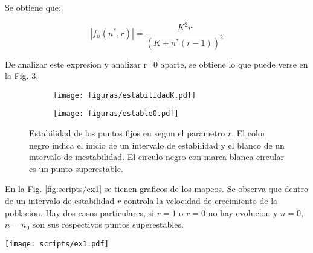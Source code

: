 \documentclass[twocolumn,aps,prl]{revtex4-1}
\newcommand{\nstar}{n^*}
\begin{document}
Se obtiene que:

$$
|f_{n}\left(n^{*},r\right)|=\frac{K^{2} r}{(K+\nstar(r-1))^{2}}
$$

De analizar este expresion y analizar r=0 aparte, se obtiene lo que puede verse en la Fig. \ref{fig:estabilidad}.

\begin{figure}[ht!]
    \centering
    \begin{subfigure}[b]{0.45\linewidth}
        \centering
        \texttt{[image: figuras/estabilidadK.pdf]}
        \caption{}
        \label{fig:figuras/estabilidadK}
    \end{subfigure}\qquad
    \begin{subfigure}[b]{0.45\linewidth}
        \centering
        \texttt{[image: figuras/estable0.pdf]}
        \caption{}
        \label{fig:figuras/estable0}
    \end{subfigure}\quad
    \caption{Estabilidad de los puntos fijos en segun el parametro $r$. El color negro indica el inicio de un intervalo de estabilidad y el blanco de un intervalo de inestabilidad. El circulo negro con marca blanca circular es un punto superestable.}
    \label{fig:estabilidad}
\end{figure}

En la Fig. \ref{fig:scripts/ex1} se tienen graficos de los mapeos. Se observa que dentro de un intervalo de estabilidad $r$ controla la velocidad de crecimiento de la poblacion. Hay dos casos particulares, si $r=1$ o $r=0$ no hay evolucion y $n=0$, $n=n_0$ son sus respectivos puntos superestables. 


\begin{figure*}[ht!]  
    \centering
        \centering 
        \texttt{[image: scripts/ex1.pdf]}
        \caption{Grafico del mapeo para distintos valores del parametro $r$, los puntos fijos se indican con linea punteada}
        \label{fig:scripts/ex1}
\end{figure*}

\end{document}
